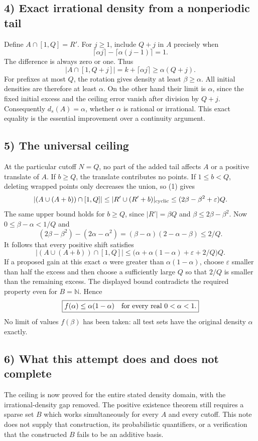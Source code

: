 \subsection*{4) Exact irrational density from a nonperiodic tail}
Define $A\cap[1,Q]=R'$. For $j\ge1$, include $Q+j$ in $A$ precisely when
\[
 \lceil\alpha j\rceil-\lceil\alpha(j-1)\rceil=1.
\]
The difference is always zero or one. Thus
\[
 |A\cap[1,Q+j]|=k+\lceil\alpha j\rceil\ge\alpha(Q+j).
\]
For prefixes at most $Q$, the rotation gives density at least $\beta\ge\alpha$. All initial densities are therefore at least $\alpha$. On the other hand their limit is $\alpha$, since the fixed initial excess and the ceiling error vanish after division by $Q+j$. Consequently $d_s(A)=\alpha$, whether $\alpha$ is rational or irrational. This exact equality is the essential improvement over a continuity argument.

\subsection*{5) The universal ceiling}
At the particular cutoff $N=Q$, no part of the added tail affects $A$ or a positive translate of $A$. If $b\ge Q$, the translate contributes no points. If $1\le b<Q$, deleting wrapped points only decreases the union, so (1) gives
\[
 |(A\cup(A+b))\cap[1,Q]|\le |R'\cup(R'+b)|_{\rm cyclic}
 \le(2\beta-\beta^2+\varepsilon)Q.
\]
The same upper bound holds for $b\ge Q$, since $|R'|=\beta Q$ and $\beta\le2\beta-\beta^2$. Now $0\le\beta-\alpha<1/Q$ and
\[
 (2\beta-\beta^2)-(2\alpha-\alpha^2)
 =(\beta-\alpha)(2-\alpha-\beta)\le2/Q.
\]
It follows that every positive shift satisfies
\[
 |(A\cup(A+b))\cap[1,Q]|\le
 \bigl(\alpha+\alpha(1-\alpha)+\varepsilon+2/Q\bigr)Q.
\]
If a proposed gain at this exact $\alpha$ were greater than $\alpha(1-\alpha)$, choose $\varepsilon$ smaller than half the excess and then choose a sufficiently large $Q$ so that $2/Q$ is smaller than the remaining excess. The displayed bound contradicts the required property even for $B=\mathbb N$. Hence
\[
 \boxed{f(\alpha)\le\alpha(1-\alpha)\quad\hbox{for every real }0<\alpha<1.}
\]
No limit of values $f(\beta)$ has been taken: all test sets have the original density $\alpha$ exactly.

\subsection*{6) What this attempt does and does not complete}
The ceiling is now proved for the entire stated density domain, with the irrational-density gap removed. The positive existence theorem still requires a sparse set $B$ which works simultaneously for every $A$ and every cutoff. This note does not supply that construction, its probabilistic quantifiers, or a verification that the constructed $B$ fails to be an additive basis.

